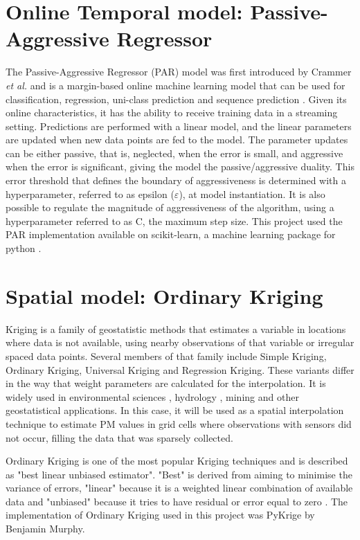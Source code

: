 \section{Online Temporal model: Passive-Aggressive Regressor}
\label{chap:par}
The Passive-Aggressive Regressor (PAR) model was first introduced by Crammer \textit{et al.} and is a margin-based online machine learning model that can be used for classification, regression, uni-class prediction and sequence prediction \cite{crammer}. Given its online characteristics, it has the ability to receive training data in a streaming setting.
Predictions are performed with a linear model, and the linear parameters are updated when new data points are fed to the model. The parameter updates can be either passive, that is, neglected, when the error is small, and aggressive when the error is significant, giving the model the passive/aggressive duality. This error threshold that defines the boundary of aggressiveness  is determined with a hyperparameter, referred to as epsilon ($\varepsilon$), at model instantiation. It is also possible to regulate the magnitude of aggressiveness of the algorithm, using a hyperparameter referred to as C, the maximum step size. This project used the PAR implementation available on scikit-learn, a machine learning package for python \cite{scikit-learn}.

\section{Spatial model: Ordinary Kriging}
\label{chap:ok}
Kriging is a family of geostatistic methods that estimates a variable in locations where data is not available, using nearby observations of that variable or irregular spaced data points. Several members of that family include Simple Kriging, Ordinary Kriging, Universal Kriging and Regression Kriging. These variants differ in the way that weight parameters are calculated for the interpolation. It is widely used in environmental sciences \cite{envscience}, hydrology \cite{hydrology}, mining \cite{mining} and other geostatistical applications. In this case, it will be used as a spatial interpolation technique to estimate PM values in grid cells where observations with sensors did not occur, filling the data that was sparsely collected.

Ordinary Kriging is one of the most popular Kriging techniques and is described as "best linear unbiased estimator". "Best" is derived from aiming to minimise the variance of errors, "linear" because it is a weighted linear combination of available data and "unbiased" because it tries to have residual or error equal to zero \cite{ordkriging}.
The implementation of Ordinary Kriging used in this project was PyKrige \cite{pykrige} by Benjamin Murphy.

